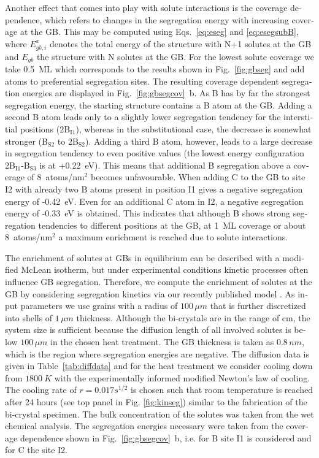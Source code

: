 \documentclass[12pt,a4paper,twoside,twocolumn,english,english]{article}
\begin{document}
\begin{otherlanguage}{english}
Another effect that comes into play with solute interactions is the coverage dependence, which refers to changes in the segregation energy with increasing coverage at the GB. This may be computed using Eqs.~\ref{eq:eseg} and \ref{eq:esegsubB}, where $E_{gb,i}^x$ denotes the total energy of the structure with N+1 solutes at the GB and $E_{gb}$ the structure with N solutes at the GB. For the lowest solute coverage we take 0.5~ML which corresponds to the results shown in Fig.~\ref{fig:gbseg} and add atoms to preferential segregation sites. The resulting coverage dependent segregation energies are displayed in Fig.~\ref{fig:gbsegcov}~b. As B has by far the strongest segregation energy, the starting structure contains a B atom at the GB. Adding a second B atom leads only to a slightly lower segregation tendency for the interstitial positions (2B$_\mathrm{I1}$), whereas in the substitutional case, the decrease is somewhat stronger (B$_\mathrm{S2}$ to 2B$_\mathrm{S2}$). Adding a third B atom, however, leads to a large decrease in segregation tendency to even positive values (the lowest energy configuration 2B$_\mathrm{I1}$-B$_\mathrm{S3}$ is at +0.22~eV). This means that additional B segregation above a coverage of 8~atoms/nm$^2$ becomes unfavourable. When adding C to the GB to site I2 with already two B atoms present in position I1 gives a negative segregation energy of -0.42~eV. Even for an additional C atom in I2, a negative segregation energy of -0.33~eV is obtained. This indicates that although B shows strong segregation tendencies to different positions at the GB, at 1~ML coverage or about 8~atoms/nm$^2$ a maximum enrichment is reached due to solute interactions.

The enrichment of solutes at GBs in equilibrium can be described with a modified McLean isotherm, but under experimental conditions kinetic processes often influence GB segregation. Therefore, we compute the enrichment of solutes at the GB by considering segregation kinetics via our recently published model \cite{scheiber2018kinetics,scheiber2020solute}. As input parameters we use grains with a radius of $100\,\mu m$ that is further discretized into shells of  $1\,\mu m$ thickness. Although the bi-crystals are in the range of cm, the system size is sufficient because the diffusion length of all involved solutes is below $100\,\mu m$ in the chosen heat treatment. The GB thickness is taken as $0.8\,nm$, which is the region where segregation energies are negative. The diffusion data is given in Table~\ref{tab:diffdata} and for the heat treatment we consider cooling down from $1800~\unit{K}$ with the experimentally informed \cite{scheiber2018kinetics} modified Newton's law of cooling. The cooling rate of $r=0.017 s^{1/2}$ is chosen such that room temperature is reached after 24 hours (see top panel in Fig. \ref{fig:kinseg}) similar to the fabrication of the bi-crystal specimen. The bulk concentration of the solutes was taken from the wet chemical analysis. The segregation energies necessary were taken from the coverage dependence shown in Fig.~\ref{fig:gbsegcov}~b, i.e. for B site I1 is considered and for C the site I2.


\end{otherlanguage}
\end{document}

